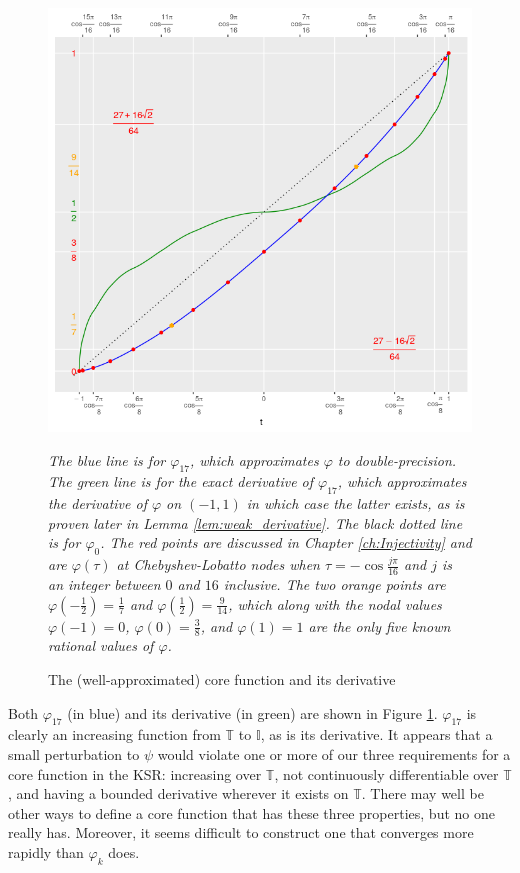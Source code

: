 \begin{figure}
    \begin{center}
    \caption{The (well-approximated) core function and its derivative}
    \label{fig:core}
    \includegraphics[width=0.95\linewidth]{../images/core.png}
    \end{center}
    \emph{The blue line is for $\varphi_{17}$, which approximates $\varphi$ to double-precision. The green line is for the exact derivative of $\varphi_{17}$, which approximates the derivative of $\varphi$ on $\left(-1,1\right)$ in which case the latter exists, as is proven later in Lemma \ref{lem:weak_derivative}. The black dotted line is for $\varphi_0$. The red points are discussed in Chapter \ref{ch:Injectivity} and are $\varphi\left(\tau\right)$ at Chebyshev-Lobatto nodes when $\tau = -\cos\frac{j\pi}{16}$ and $j$ is an integer between $0$ and $16$ inclusive. The two orange points are $\varphi\left(-\frac{1}{2}\right) = \frac{1}{7}$ and $\varphi\left(\frac{1}{2}\right) = \frac{9}{14}$, which along with the nodal values $\varphi\left(-1\right) = 0$, $\varphi\left(0\right) = \frac{3}{8}$, and $\varphi\left(1\right) = 1$ are the only five known rational values of $\varphi$.}
\end{figure}

Both $\varphi_{17}$ (in blue) and its derivative (in green) are shown in Figure \ref{fig:core}. $\varphi_{17}$ is clearly an increasing function from $\mathbb{T}$ to $\mathbb{I}$, as is its derivative. It appears that a small perturbation to $\psi$ would violate one or more of our three requirements for a core function in the KSR: increasing over $\mathbb{T}$, not continuously differentiable over $\mathbb{T}$, and having a bounded derivative wherever it exists on $\mathbb{T}$. There may well be other ways to define a core function that has these three properties, but no one really has. Moreover, it seems difficult to construct one that converges more rapidly than $\varphi_k$ does. 

